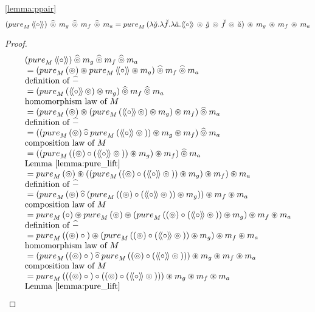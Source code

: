 \begin{lemmaa}{\ref{lemma:ppair}}
$$
(\apure_M\,\ppair{\comp})\, \alift{\pappl}\, m_g\, \alift{\pappl}\, m_f\, \alift{\pappl}\, m_a
= \apure_M\,(\lambda \pstr{g}. \lambda \pstr{f}. \lambda \pstr{a}. \ppair{\comp}\, \pappl\, \pstr{g} \, \pappl\, \pstr{f} \, \pappl\, \pstr{a})\, \appl\, m_g\, \appl\, m_f\, \appl\, m_a 
$$
\end{lemmaa}
\begin{proof}
$$
\begin{array}{ll}
(\apure_M\,\ppair{\comp}) \alift{\pappl} m_g \alift{\pappl} m_f \alift{\pappl} m_a\\
{}=
(\apure_M\,(\pappl) \appl \apure_M\,\ppair{\comp} \appl m_g) \alift{\pappl} m_f \alift{\pappl} m_a\\
\mbox{definition of }\alift{-}\\
{}= (\apure_M\,(\ppair{\comp}\, \pappl) \appl m_g) \alift{\pappl} m_f \alift{\pappl} m_a\\
 \mbox{homomorphism law of }M\\
{}= (\apure_M\,(\pappl) \appl (\apure_M\,(\ppair{\comp}\, \pappl) \appl m_g) \appl m_f) \alift{\pappl} m_a\\
\mbox{definition of }\alift{-}\\
{}= (
       (\apure_M\,(\pappl) \alift{\comp} \apure_M\,(\ppair{\comp} \pappl {}))
       \appl m_g
     \appl m_f) \alift{\pappl} m_a\\
\mbox{composition law of }M\\
{}= ((
       \apure_M\,((\pappl) \comp (\ppair{\comp} \pappl {}))
       \appl m_g
     ) \appl m_f) \alift{\pappl} m_a\\
\mbox{Lemma \ref{lemma:pure_lift}}\\
{}= \apure_M\,(\pappl) \appl
    ((
       \apure_M\,((\pappl) \comp (\ppair{\comp} \pappl {}))
       \appl m_g
     ) \appl m_f) \appl m_a\\
\mbox{definition of }\alift{-}\\
{}= (\apure_M\,(\pappl) \alift{\comp}
     (\apure_M\,((\pappl) \comp (\ppair{\comp} \pappl {}))
       \appl m_g))
    \appl m_f \appl m_a\\
\mbox{composition law of }M\\
{}= \apure_M\,(\comp) \appl
     \apure_M\,(\pappl) \appl
     (\apure_M\,((\pappl) \comp (\ppair{\comp} \pappl {}))
       \appl m_g)
    \appl m_f \appl m_a\\
\mbox{definition of }\alift{-}\\
{}= \apure_M\,((\pappl) \comp {}) \appl
     (\apure_M\,((\pappl) \comp (\ppair{\comp} \pappl {}))
       \appl m_g)
    \appl m_f \appl m_a\\
 \mbox{homomorphism law of }M\\
{}= (\apure_M\,((\pappl) \comp {}) \alift{\comp}
     \apure_M\,((\pappl) \comp (\ppair{\comp} \pappl {})))
    \appl m_g \appl m_f \appl m_a\\
\mbox{composition law of }M\\
{}= \apure_M\,(((\pappl) \comp {}) \comp
                ((\pappl) \comp (\ppair{\comp} \pappl {})))
    \appl m_g \appl m_f \appl m_a\\
\mbox{Lemma \ref{lemma:pure_lift}}
\end{array}
$$


\end{proof}
